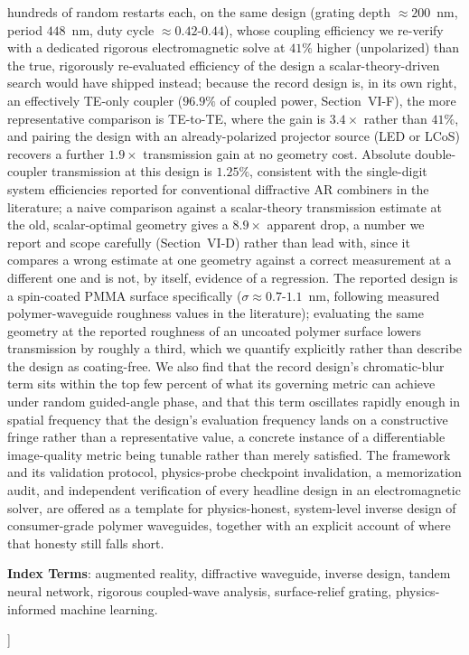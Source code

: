 \documentclass[10pt,twocolumn]{article}
\begin{document}
\begin{@twocolumnfalse}
\begin{center}
\begin{minipage}{0.92\textwidth}
hundreds of random restarts each, on the same design (grating depth
$\approx 200$~nm, period $448$~nm, duty cycle $\approx 0.42$-$0.44$), whose
coupling efficiency we re-verify with a dedicated rigorous electromagnetic
solve at $41\%$ higher (unpolarized) than the true, rigorously
re-evaluated efficiency of the design a scalar-theory-driven search would
have shipped instead; because the record design is, in its own right, an
effectively TE-only coupler ($96.9\%$ of coupled power, Section~VI-F), the
more representative comparison is TE-to-TE, where the gain is $3.4\times$
rather than $41\%$, and pairing the design with an already-polarized
projector source (LED or LCoS) recovers a further $1.9\times$ transmission
gain at no geometry cost. Absolute double-coupler transmission at this
design is $1.25\%$, consistent with the single-digit system efficiencies
reported for conventional diffractive AR combiners in the literature; a
naive comparison against a scalar-theory transmission estimate at the old,
scalar-optimal geometry gives a $8.9\times$ apparent drop, a number we
report and scope carefully (Section~VI-D) rather than lead with, since it
compares a wrong estimate at one geometry against a correct measurement at
a different one and is not, by itself, evidence of a regression. The reported design is a
spin-coated PMMA surface specifically ($\sigma\approx0.7$-$1.1$~nm, following
measured polymer-waveguide roughness values in the literature); evaluating
the same geometry at the reported roughness of an uncoated polymer surface
lowers transmission by roughly a third, which we quantify explicitly rather
than describe the design as coating-free. We also find that the record
design's chromatic-blur term sits within the top few percent of what its
governing metric can achieve under random guided-angle phase, and that this
term oscillates rapidly enough in spatial frequency that the design's
evaluation frequency lands on a constructive fringe rather than a
representative value, a concrete instance of a differentiable image-quality
metric being tunable rather than merely satisfied. The framework and its
validation protocol, physics-probe checkpoint invalidation, a memorization
audit, and independent verification of every headline design in an
electromagnetic solver, are offered as a template for physics-honest,
system-level inverse design of consumer-grade polymer waveguides, together
with an explicit account of where that honesty still falls short.

\smallskip
\textbf{Index Terms}: augmented reality, diffractive waveguide,
inverse design, tandem neural network, rigorous coupled-wave analysis,
surface-relief grating, physics-informed machine learning.
\end{minipage}
\end{center}
\bigskip
\end{@twocolumnfalse}
]
\end{document}
